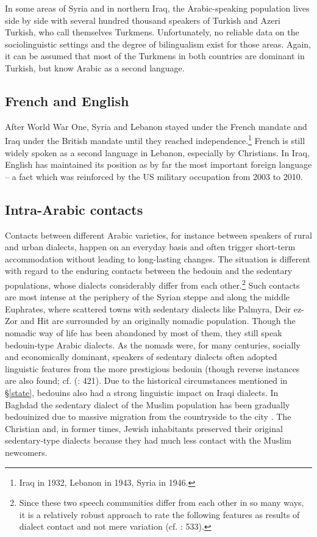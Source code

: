 \documentclass[output=paper]{langsci/langscibook}
\begin{document}
In some areas of Syria and in northern Iraq, the Arabic-speaking population lives side by side with several hundred thousand speakers of Turkish and Azeri Turkish, who call themselves Turkmens. Unfortunately, no reliable data on the sociolinguistic settings and the degree of bilingualism exist for those areas. Again, it can be assumed that most of the Turkmens in both countries are dominant in Turkish, but know Arabic as a second language.

 \subsection{French and English} \label{french}

After World War One, Syria and Lebanon stayed under the French mandate and Iraq under the British mandate until they reached independence.\footnote{Iraq in 1932, Lebanon in 1943, Syria in 1946.} French is still widely spoken as a second language in Lebanon, especially by Christians. In Iraq, English has maintained its position as by far the most important foreign language – a fact which was reinforced by the US military occupation from 2003 to 2010. 

  \subsection{Intra-Arabic contacts} 

Contacts between different Arabic varieties, for instance between speakers of rural and urban dialects, happen on an everyday basis and often trigger short-term accommodation without leading to long-lasting changes. The situation is different with regard to the enduring contacts between the bedouin and the sedentary populations, whose dialects considerably differ from each other.\footnote{Since these two speech communities differ from each other in so many ways, it is a relatively robust approach to rate the following features as results of dialect contact and not mere variation (cf. \citealt{Lucas2015}: 533).} Such contacts are most intense at the periphery of the Syrian steppe and along the middle Euphrates, where scattered towns with sedentary dialects like Palmyra, Deir ez-Zor and Hit are surrounded by an originally nomadic population. Though the nomadic way of life has been abandoned by most of them, they still speak bedouin-type Arabic dialects. As the nomads were, for many centuries, socially and economically dominant, speakers of sedentary dialects often adopted linguistic features from the more prestigious bedouin (though reverse instances are also found; cf. (\citealt{Behnstedt1994Dialektkontakt}: 421). Due to the historical circumstances mentioned in §\ref{state}, bedouins also had a strong linguistic impact on Iraqi dialects. In Baghdad the sedentary dialect of the Muslim population has been gradually bedouinized due to massive migration from the countryside to the city \citep{Palva2009}. The Christian and, in former times, Jewish inhabitants preserved their original sedentary-type dialects because they had much less contact with the Muslim newcomers. 
\end{document}
